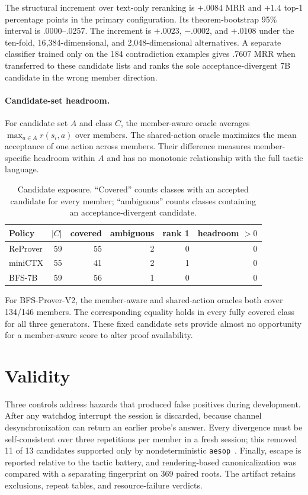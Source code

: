 \documentclass[11pt]{article}
\begin{document}
The structural increment over text-only reranking is $+.0084$ MRR and $+1.4$
top-1 percentage points in the primary configuration. Its theorem-bootstrap
95\% interval is .0000--.0257. The increment is $+.0023$, $-.0002$, and
$+.0108$ under the ten-fold, 16{,}384-dimensional, and 2{,}048-dimensional
alternatives. A separate classifier trained only on the 184 contradiction
examples gives .7607 MRR when transferred to these candidate lists and ranks
the sole acceptance-divergent 7B candidate in the wrong member direction.

\paragraph{Candidate-set headroom.}
For candidate set $A$ and class $C$, the member-aware oracle averages
$\max_{a\in A}r(s_i,a)$ over members. The shared-action oracle maximizes the
mean acceptance of one action across members. Their difference measures
member-specific headroom within $A$ and has no monotonic relationship with
the full tactic language.

\begin{table}[t]\centering\small
\setlength{\tabcolsep}{2.8pt}
\begin{tabular}{@{}lrrrrr@{}}
\toprule
Policy & $|C|$ & covered & ambiguous & rank 1 & headroom $>0$ \\
\midrule
ReProver & 59 & 55 & 2 & 0 & 0 \\
miniCTX & 55 & 41 & 2 & 1 & 0 \\
BFS-7B & 59 & 56 & 1 & 0 & 0 \\
\bottomrule
\end{tabular}
\caption{Candidate exposure. ``Covered'' counts classes with an accepted
candidate for every member; ``ambiguous'' counts classes containing an
acceptance-divergent candidate.}
\label{tab:exposure}
\end{table}

For BFS-Prover-V2, the member-aware and shared-action oracles both cover
134/146 members. The corresponding equality holds in every fully covered
class for all three generators. These fixed candidate sets provide almost no
opportunity for a member-aware score to alter proof availability.

\section{Validity}
\label{app:validity}
Three controls address hazards that produced false positives during development.
After any watchdog interrupt the session is discarded, because channel
desynchronization can return an earlier probe's answer. Every divergence must
be self-consistent over three repetitions per member in a fresh session; this
removed 11 of 13 candidates supported only by nondeterministic
\texttt{aesop}~\cite{limperg2023aesop}. Finally, escape is reported relative to
the tactic battery, and rendering-based canonicalization was compared with a
separating fingerprint on 369 paired roots. The artifact retains exclusions,
repeat tables, and resource-failure verdicts.
\end{document}
